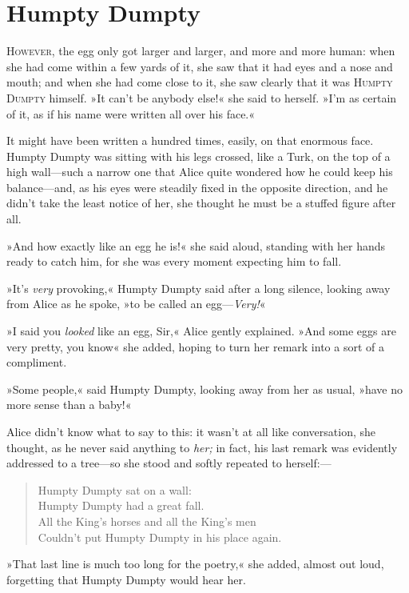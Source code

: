 \chapter{Humpty Dumpty}

\label{white5}
\lettrine[lines=4]{H}{owever,} the egg only got larger and larger, and more and more human: when she had come within a few yards of it, she saw that it had eyes and a nose and mouth; and when she had come close to it, she saw clearly that it was \textsc{Humpty Dumpty} himself. »It can't be anybody else!« she said to herself. »I'm as certain of it, as if his name were written all over his face.«

It might have been written a hundred times, easily, on that enormous face. Humpty Dumpty was sitting with his legs crossed, like a Turk, on the top of a high wall—such a narrow one that Alice quite wondered how he could keep his balance—and, as his eyes were steadily fixed in the opposite direction, and he didn't take the least notice of her, she thought he must be a stuffed figure after all.

»And how exactly like an egg he is!« she said aloud, standing with her hands ready to catch him, for she was every moment expecting him to fall.

»It's \textit{very} provoking,« Humpty Dumpty said after a long silence, looking away from Alice as he spoke, »to be called an egg—\textit{Very!}«

»I said you \textit{looked} like an egg, Sir,« Alice gently explained. »And some eggs are very pretty, you know« she added, hoping to turn her remark into a sort of a compliment.

»Some people,« said Humpty Dumpty, looking away from her as usual, »have no more sense than a baby!«

Alice didn't know what to say to this: it wasn't at all like conversation, she thought, as he never said anything to \textit{her;} in fact, his last remark was evidently addressed to a tree—so she stood and softly repeated to herself:—

\begin{verse}
Humpty Dumpty sat on a wall:\\
Humpty Dumpty had a great fall.\\
All the King's horses and all the King's men\\
Couldn't put Humpty Dumpty in his place again.
\end{verse}

»That last line is much too long for the poetry,« she added, almost out loud, forgetting that Humpty Dumpty would hear her.

